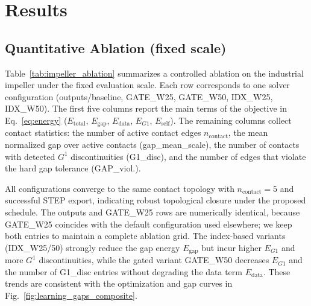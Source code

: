 \documentclass{ieeeaccess}
\begin{document}
\section{Results}
\label{sec:results}

\subsection{Quantitative Ablation (fixed scale)}
\label{sec:impeller_ablation}
Table~\ref{tab:impeller_ablation} summarizes a controlled ablation on the
industrial impeller under the fixed evaluation scale. Each row corresponds
to one solver configuration (outputs/baseline, GATE\_W25, GATE\_W50,
IDX\_W25, IDX\_W50). The first five columns report the main terms of the
objective in Eq.~\eqref{eq:energy} ($E_{\text{total}}$, $E_{\text{gap}}$,
$E_{\text{data}}$, $E_{G1}$, $E_{\text{self}}$). The remaining columns
collect contact statistics: the number of active contact edges
$n_{\text{contact}}$, the mean normalized gap over active contacts
(gap\_mean\_scale), the number of contacts with detected $G^1$
discontinuities (G1\_disc), and the number of edges that violate the hard
gap tolerance (GAP\_viol.).

All configurations converge to the same contact topology with
$n_{\text{contact}} = 5$ and successful STEP export, indicating robust
topological closure under the proposed schedule. The outputs and GATE\_W25
rows are numerically identical, because GATE\_W25 coincides with the
default configuration used elsewhere; we keep both entries to maintain a
complete ablation grid. The index-based variants (IDX\_W25/50) strongly
reduce the gap energy $E_{\text{gap}}$ but incur higher $E_{G1}$ and more
$G^1$ discontinuities, while the gated variant GATE\_W50 decreases
$E_{G1}$ and the number of G1\_disc entries without degrading the data term
$E_{\text{data}}$. These trends are consistent with the optimization and
gap curves in Fig.~\ref{fig:learning_gaps_composite}.
\end{document}
